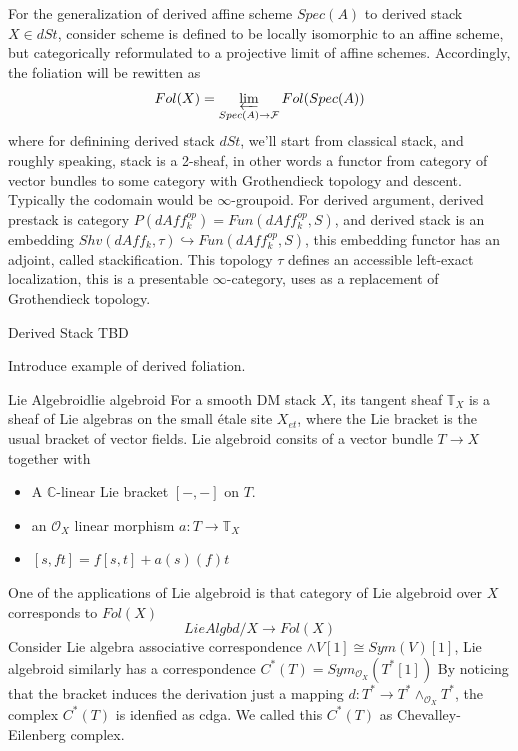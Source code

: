 \documentclass{article}
\begin{document}
\noindent
For the generalization of derived affine scheme $Spec(A)$ to derived stack $X\in dSt$, 
consider scheme is defined to be locally isomorphic to an affine scheme, 
but categorically reformulated to a projective limit of affine schemes.
Accordingly, the foliation will be rewitten as 
\[Fol(X)  = \varprojlim_{Spec(A)\to \mathcal{F}} Fol(Spec(A)) \]
where for definining derived stack $dSt$, we'll start from classical stack,
and roughly speaking, stack is a 2-sheaf, in other words a functor from category of vector bundles to
some category with Grothendieck topology and descent. Typically the codomain would be $\infty$-groupoid.
For derived argument, derived prestack is category $P(dAff_k^{op}) = Fun(dAff_k^{op}, S)$,
and derived stack is an embedding $Shv(dAff_k, \tau) \hookrightarrow Fun(dAff_k^{op}, S)$, this embedding functor has an adjoint,
called stackification. This topology $\tau$ defines an accessible left-exact localization, this is a presentable $\infty$-category,
uses as a replacement of Grothendieck topology. \\


\begin{definition}{Derived Stack}{}
TBD
\end{definition}


\noindent
Introduce example of derived foliation.


\begin{definition}{Lie Algebroid}{lie algebroid}
For a smooth DM stack $X$, its tangent sheaf $\mathbb{T}_X$ is a sheaf of Lie algebras on the small \'etale site $X_{et}$,
where the Lie bracket is the usual bracket of vector fields. Lie algebroid consits of a vector bundle $T\to X$ together with 
\begin{itemize}
\item A $\mathbb{C}$-linear Lie bracket $[-,-]$ on $T$.
\item an $\mathcal{O}_X$ linear morphism $a:T\to \mathbb{T}_X$
\item $[s,ft] = f[s,t] + a(s)(f) t$
\end{itemize}
\end{definition}


\noindent
One of the applications of Lie algebroid is that category of Lie algebroid over $X$ corresponds to $Fol(X)$
\[ LieAlgbd/X \to  Fol(X) \]
Consider Lie algebra associative correspondence $\wedge V[1] \cong Sym(V)[1]$, 
Lie algebroid similarly has a correspondence $C^*(T) = Sym_{\mathcal{O}_X}(T^*[1])$
By noticing that the bracket induces the derivation just a mapping $d: T^* \to T^* \wedge_{\mathcal{O}_X} T^*$,
the complex $C^*(T)$ is idenfied as cdga. We called this $C^*(T)$ as Chevalley-Eilenberg complex.
\end{document}
